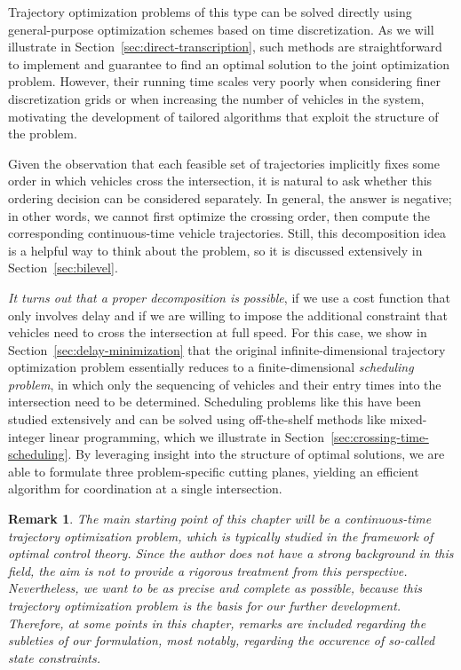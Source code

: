 \documentclass[a4paper]{report}
\theoremstyle{definition}
\theoremstyle{plain}
\newtheorem{remark}{Remark}[chapter]
\begin{document}
Trajectory optimization problems of this type can be solved directly using
general-purpose optimization schemes based on time discretization.
%
As we will illustrate in Section~\ref{sec:direct-transcription}, such methods
are straightforward to implement and guarantee to find an optimal solution to
the joint optimization problem. However, their running time scales very poorly
when considering finer discretization grids or when increasing the number of
vehicles in the system, motivating the development of tailored algorithms that
exploit the structure of the problem.

Given the observation that each feasible set of trajectories implicitly fixes
some order in which vehicles cross the intersection, it is natural to ask
whether this ordering decision can be considered separately.
%
In general, the answer is negative; in other words, we cannot first optimize the
crossing order, then compute the corresponding continuous-time vehicle
trajectories.
%
Still, this decomposition idea is a helpful way to think about the problem, so
it is discussed extensively in Section~\ref{sec:bilevel}.

\emph{It turns out that a proper decomposition is possible}, if we use a cost
function that only involves delay and if we are willing to impose the additional
constraint that vehicles need to cross the intersection at full speed. For this
case, we show in Section~\ref{sec:delay-minimization} that the original
infinite-dimensional trajectory optimization problem essentially reduces to a
finite-dimensional \emph{scheduling problem}, in which only the sequencing of
vehicles and their entry times into the intersection need to be determined.
%
Scheduling problems like this have been studied extensively and can be solved
using off-the-shelf methods like mixed-integer linear programming, which we
illustrate in Section~\ref{sec:crossing-time-scheduling}.
%
By leveraging insight into the structure of optimal solutions, we are able to
formulate three problem-specific cutting planes, yielding an efficient
algorithm for coordination at a single intersection.

\begin{remark}
  The main starting point of this chapter will be a continuous-time trajectory
  optimization problem, which is typically studied in the framework of optimal
  control theory. Since the author does not have a strong background in this
  field, the aim is not to provide a rigorous treatment from this perspective.
  Nevertheless, we want to be as precise and complete as possible, because this
  trajectory optimization problem is the basis for our further development.
  Therefore, at some points in this chapter, remarks are included regarding the
  subleties of our formulation, most notably, regarding the occurence of
  so-called state constraints.
\end{remark}
\end{document}
